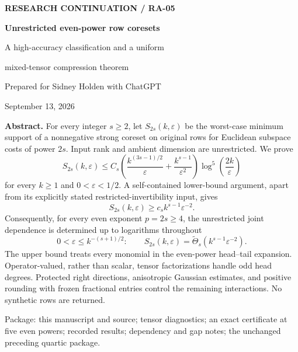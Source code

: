 \documentclass[11pt]{article}
\theoremstyle{remark}\newtheorem{remark}[theorem]{Remark}
\newcommand{\eps}{\varepsilon}\newcommand{\Sym}{\operatorname{Sym}}
\begin{document}
\begin{titlepage}
{\small\bfseries RESEARCH CONTINUATION / RA-05}\par\vspace{1.2cm}
{\huge\bfseries Unrestricted even-power row coresets}\par\vspace{.45cm}
{\Large A high-accuracy classification and a uniform\par mixed-tensor compression theorem}\par\vspace{.8cm}
Prepared for Sidney Holden with ChatGPT\par
September 13, 2026\par\vspace{.7cm}
\textbf{Abstract.} For every integer $s\ge2$, let $S_{2s}(k,\eps)$ be the worst-case minimum support of a nonnegative strong coreset on original rows for Euclidean subspace costs of power $2s$. Input rank and ambient dimension are unrestricted. We prove
\[
 S_{2s}(k,\eps)\le C_s\left(\frac{k^{(3s-1)/2}}{\eps}+\frac{k^{s-1}}{\eps^2}\right)
 \log^5\!\left(\frac{2k}{\eps}\right)
\]
for every $k\ge1$ and $0<\eps<1/2$. A self-contained lower-bound argument, apart from its explicitly stated restricted-invertibility input, gives
\[
 S_{2s}(k,\eps)\ge c_s k^{s-1}\eps^{-2}.
\]
Consequently, for every even exponent $p=2s\ge4$, the unrestricted joint dependence is determined up to logarithms throughout
\[
 0<\eps\le k^{-(s+1)/2}:\qquad
 S_{2s}(k,\eps)=\widetilde\Theta_s(k^{s-1}\eps^{-2}).
\]
The upper bound treats every monomial in the even-power head--tail expansion. Operator-valued, rather than scalar, tensor factorizations handle odd head degrees. Protected right directions, anisotropic Gaussian estimates, and positive rounding with frozen fractional entries control the remaining interactions. No synthetic rows are returned.

\vspace{.3cm}
\vfill
{\small Package: this manuscript and source; tensor diagnostics; an exact certificate at five even powers; recorded results; dependency and gap notes; the unchanged preceding quartic package.}
\end{titlepage}
{\small\setlength{\parskip}{0pt}\tableofcontents}\newpage
\end{document}
